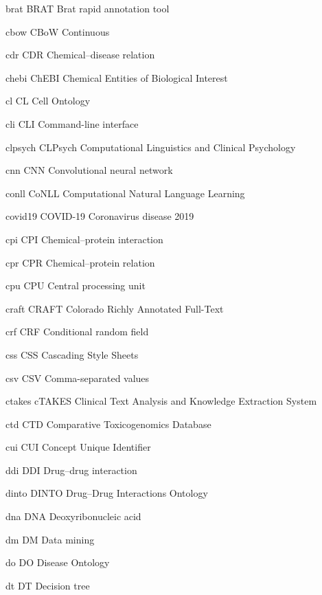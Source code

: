 \newabbreviation
{brat}
{BRAT}
{Brat rapid annotation tool}

\newabbreviation
{cbow}
{CBoW}
{Continuous }

\newabbreviation
{cdr}
{CDR}
{Chemical--disease relation}

\newabbreviation
{chebi}
{ChEBI}
{Chemical Entities of Biological Interest}

\newabbreviation
{cl}
{CL}
{Cell Ontology}

\newabbreviation
{cli}
{CLI}
{Command-line interface}

\newabbreviation
{clpsych}
{CLPsych}
{Computational Linguistics and Clinical Psychology}

\newabbreviation
{cnn}
{CNN}
{Convolutional neural network}

\newabbreviation
{conll}
{CoNLL}
{Computational Natural Language Learning}

\newabbreviation
{covid19}
{COVID-19}
{Coronavirus disease 2019}

\newabbreviation
{cpi}
{CPI}
{Chemical--protein interaction}

\newabbreviation
{cpr}
{CPR}
{Chemical--protein relation}

\newabbreviation
{cpu}
{CPU}
{Central processing unit}

\newabbreviation
{craft}
{CRAFT}
{Colorado Richly Annotated Full-Text}

\newabbreviation
{crf}
{CRF}
{Conditional random field}

\newabbreviation
{css}
{CSS}
{Cascading Style Sheets}

\newabbreviation
{csv}
{CSV}
{Comma-separated values}

\newabbreviation
{ctakes}
{cTAKES}
{Clinical Text Analysis and Knowledge Extraction System}

\newabbreviation
{ctd}
{CTD}
{Comparative Toxicogenomics Database}

\newabbreviation
{cui}
{CUI}
{Concept Unique Identifier}

\newabbreviation
{ddi}
{DDI}
{Drug--drug interaction}

\newabbreviation
{dinto}
{DINTO}
{Drug--Drug Interactions Ontology}

\newabbreviation
{dna}
{DNA}
{Deoxyribonucleic acid}

\newabbreviation
{dm}
{DM}
{Data mining}

\newabbreviation
{do}
{DO}
{Disease Ontology}

\newabbreviation
{dt}
{DT}
{Decision tree}

